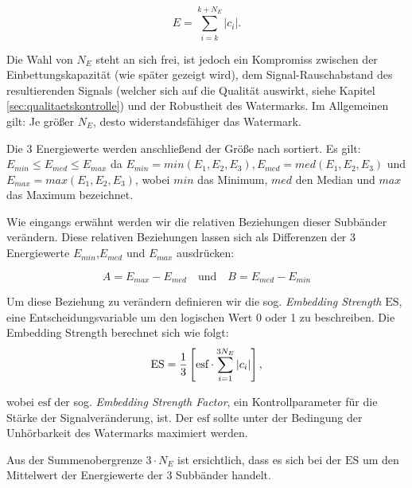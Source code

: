 	\begin{equation}
		E = \sum\limits_{i=k}^{k+{N}_{E}}|c_i|.
		\label{equ:energy}
	\end{equation}

Die Wahl von ${N}_{E}$ steht an sich frei, ist jedoch ein Kompromiss zwischen der Einbettungskapazität (wie später gezeigt wird), dem Signal-Rauschabstand des resultierenden Signals (welcher sich auf die Qualität auswirkt\cite{xiang2007robust}, siehe Kapitel \ref{sec:qualitaetskontrolle}) und der Robustheit des Watermarks. Im Allgemeinen gilt: Je größer ${N}_{E}$, desto widerstandsfähiger das Watermark.

Die 3 Energiewerte werden anschließend der Größe nach sortiert. Es gilt: ${E}_{min}\leq{E}_{med}\leq{E}_{max}$ da ${E}_{min}=min({E}_{1}, {E}_{2}, {E}_{3}), {E}_{med}=med({E}_{1}, {E}_{2}, {E}_{3})$ und ${E}_{max}=max({E}_{1}, {E}_{2}, {E}_{3})$, wobei $min$ das Minimum, $med$ den Median und $max$ das Maximum bezeichnet. 

Wie eingangs erwähnt werden wir die relativen Beziehungen dieser Subbänder verändern. Diese relativen Beziehungen lassen sich als Differenzen der 3 Energiewerte ${E}_{min}$,${E}_{med}$ und ${E}_{max}$ ausdrücken:

	 \begin{equation}
		 A = {E}_{max}-{E}_{med} \quad\mbox{und}\quad B = {E}_{med}-{E}_{min} \label{equ:energydifferences}
	 \end{equation}
	 
Um diese Beziehung zu verändern definieren wir die sog. \textit{Embedding Strength} $\mbox{ES}$, eine Entscheidungsvariable um den logischen Wert 0 oder 1 zu beschreiben. Die Embedding Strength berechnet sich wie folgt:
	\begin{equation}
		\mbox{ES} = {1 \over 3} \left[ \mbox{esf} \cdot \sum\limits_{i=1}^{3{N}_{E}}|c_i| \right],
		\label{equ:embeddingstrength}
	\end{equation}
	
wobei $\mbox{esf}$ der sog. \textit{Embedding Strength Factor}, ein Kontrollparameter für die Stärke der Signalveränderung, ist. Der $\mbox{esf}$ sollte unter der Bedingung der Unhörbarkeit des Watermarks maximiert werden.
	 
Aus der Summenobergrenze $3 \cdot {N}_{E}$ ist ersichtlich, dass es sich bei der $\mbox{ES}$ um den Mittelwert der Energiewerte der 3 Subbänder handelt.

